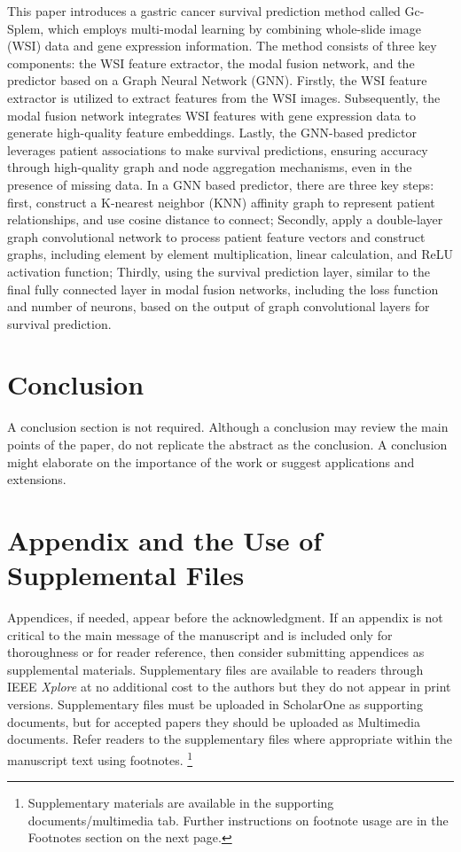 \documentclass[journal,twoside,web]{ieeecolor}
\begin{document}
This paper introduces a gastric cancer survival prediction method called Gc-Splem\cite{xie2022survival}, which employs multi-modal learning by combining whole-slide image (WSI) data and gene expression information. The method consists of three key components: the WSI feature extractor, the modal fusion network, and the predictor based on a Graph Neural Network (GNN). Firstly, the WSI feature extractor is utilized to extract features from the WSI images. Subsequently, the modal fusion network integrates WSI features with gene expression data to generate high-quality feature embeddings. Lastly, the GNN-based predictor leverages patient associations to make survival predictions, ensuring accuracy through high-quality graph and node aggregation mechanisms, even in the presence of missing data. In a GNN based predictor, there are three key steps: first, construct a K-nearest neighbor (KNN) affinity graph to represent patient relationships, and use cosine distance to connect; Secondly, apply a double-layer graph convolutional network to process patient feature vectors and construct graphs, including element by element multiplication, linear calculation, and ReLU activation function; Thirdly, using the survival prediction layer, similar to the final fully connected layer in modal fusion networks, including the loss function and number of neurons, based on the output of graph convolutional layers for survival prediction.



\section{Conclusion}
A conclusion section is not required. Although a conclusion may review the 
main points of the paper, do not replicate the abstract as the conclusion.
A conclusion might elaborate on the importance of the work or suggest 
applications and extensions.

\appendices

\section*{Appendix and the Use of Supplemental Files}
Appendices, if needed, appear before the acknowledgment. If an appendix is not
critical to the main message of the manuscript and is included only for thoroughness
or for reader reference, then consider submitting appendices as supplemental materials.
Supplementary files are available to readers through IEEE \emph{Xplore\textregistered}
at no additional cost to the authors but they do not appear in print versions.
Supplementary files must be uploaded in ScholarOne as supporting documents, but for
accepted papers they should be uploaded as Multimedia documents. Refer readers
to the supplementary files where appropriate within the manuscript text using footnotes.
\footnote{Supplementary materials are available in the supporting documents/multimedia tab.
Further instructions on footnote usage are in the Footnotes section on the next page.}
\end{document}
